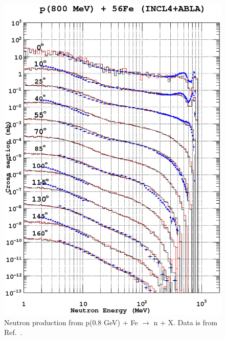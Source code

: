 \documentclass[a4paper]{jpconf}
\begin{document}
\begin{figure}
\begin{center}
\includegraphics[scale=0.70]{images/proton800MeVFev1.eps}
\caption{\label{fig:neutron08Fe}Neutron production from p(0.8 GeV) + Fe  $\rightarrow$ n + X. 
Data is from Ref.~\cite{data}.}
\end{center}

\end{figure}
\end{document}
